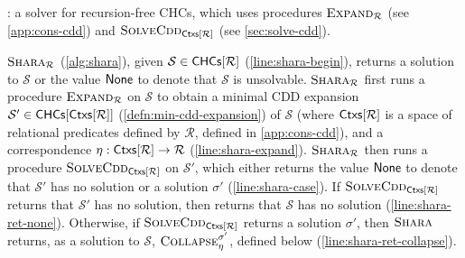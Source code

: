 \begin{algorithm}[t]
  \caption{\sys: a solver for recursion-free CHCs, which uses
    procedures $\textsc{Expand}_{\mathcal{R}}$ (see \autoref{app:cons-cdd}) and
    $\textsc{SolveCdd}_{ \mathsf{Ctxs}[  \mathcal{R}  ] }$ (see
    \autoref{sec:solve-cdd}). }
  \label{alg:shara}
\end{algorithm}
$\textsc{Shara}_{ \mathcal{R} }$ (\autoref{alg:shara}), given $\mathcal{S} \in
\mathsf{CHCs}[ \mathcal{R} ]$ (\autoref{line:shara-begin}), returns a solution
to $\mathcal{S}$ or the value $\mathsf{None}$ to denote that $\mathcal{S}$ is
unsolvable.
%
$\textsc{Shara}_{ \mathcal{R} }$ first runs a procedure $\textsc{Expand}_{ \mathcal{R}
}$ on $\mathcal{S}$ to obtain a minimal CDD expansion $\mathcal{S}'
\in \mathsf{CHCs}[  \mathsf{Ctxs}[  \mathcal{R}  ]  ]$ (\autoref{defn:min-cdd-expansion})
of $\mathcal{S}$ (where $\mathsf{Ctxs}[  \mathcal{R}  ]$ is a space of
relational predicates defined by $\mathcal{R}$, defined in
\autoref{app:cons-cdd}), and a correspondence $\eta : \mathsf{Ctxs}[ 
  \mathcal{R}  ] \to \mathcal{R}$ (\autoref{line:shara-expand}).
%
$\textsc{Shara}_{ \mathcal{R} }$ then runs a procedure $\textsc{SolveCdd}_{ \mathsf{Ctxs}[ 
    \mathcal{R}  ] }$ on $\mathcal{S}'$, which either returns the value
$\mathsf{None}$ to denote that $\mathcal{S}'$ has no solution or a solution
$\sigma'$ (\autoref{line:shara-case}).
%
If $\textsc{SolveCdd}_{ \mathsf{Ctxs}[  \mathcal{R}  ] }$ returns that $\mathcal{S}'$ has
no solution, then \sys returns that $\mathcal{S}$ has no solution
(\autoref{line:shara-ret-none}).
%
Otherwise, if $\textsc{SolveCdd}_{ \mathsf{Ctxs}[  \mathcal{R}  ] }$ returns a solution
$\sigma'$, then $\mbox{\textsc{Shara}}$ returns, as a solution to $\mathcal{S}$,
$\textsc{Collapse}_{ \eta }^{ \sigma' }$, defined below
(\autoref{line:shara-ret-collapse}).

